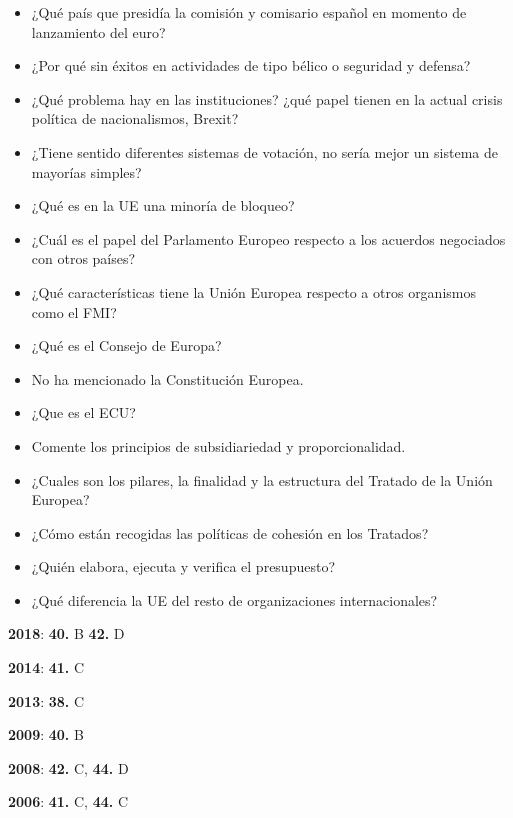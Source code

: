\documentclass{nuevotema}
\begin{document}
\begin{itemize}
    \item ¿Qué país que presidía la comisión y comisario español en momento de lanzamiento del euro?
    \item ¿Por qué sin éxitos en actividades de tipo bélico o seguridad y defensa?
    \item ¿Qué problema hay en las instituciones? ¿qué papel tienen en la actual crisis política de nacionalismos, Brexit?
    \item ¿Tiene sentido diferentes sistemas de votación, no sería mejor un sistema de mayorías simples?
    \item ¿Qué es en la UE una minoría de bloqueo?
    \item ¿Cuál es el papel del Parlamento Europeo respecto a los acuerdos negociados con otros países?
    \item ¿Qué características tiene la Unión Europea respecto a otros organismos como el FMI?
    \item ¿Qué es el Consejo de Europa?
    \item No ha mencionado la Constitución Europea.
    \item ¿Que es el ECU?
\end{itemize}

\begin{itemize}
    \item Comente los principios de subsidiariedad y proporcionalidad.
    \item ¿Cuales son los pilares, la finalidad y la estructura del Tratado de la Unión Europea?
    \item ¿Cómo están recogidas las políticas de cohesión en los Tratados?
    \item ¿Quién elabora, ejecuta y verifica el presupuesto?
    \item ¿Qué diferencia la UE del resto de organizaciones internacionales?
\end{itemize}

\notas

\textbf{2018}: \textbf{40.} B \textbf{42.} D

\textbf{2014}: \textbf{41.} C

\textbf{2013}: \textbf{38.} C

\textbf{2009}: \textbf{40.} B

\textbf{2008}: \textbf{42.} C, \textbf{44.} D

\textbf{2006}: \textbf{41.} C, \textbf{44.} C
\end{document}
